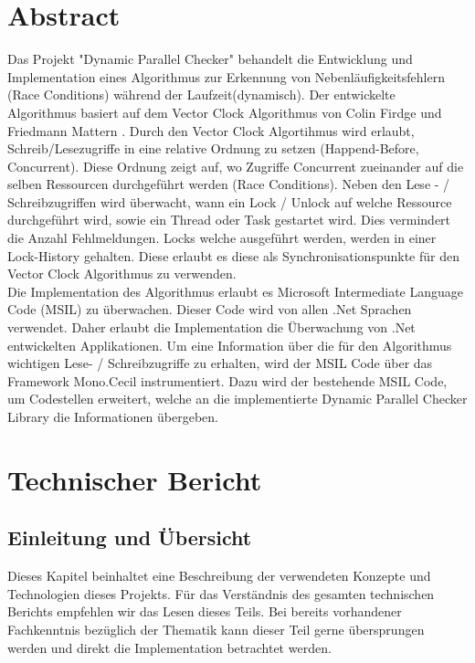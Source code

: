 \documentclass[10pt,a4paper]{article}
\begin{document}
\section{Abstract}
\begin{flushleft}
Das Projekt "Dynamic Parallel Checker" behandelt die Entwicklung und Implementation eines Algorithmus zur Erkennung von Nebenläufigkeitsfehlern (Race Conditions) während der Laufzeit(dynamisch). Der entwickelte Algorithmus basiert auf dem Vector Clock Algorithmus von Colin Firdge und Friedmann Mattern \cite{acsc}. Durch den Vector Clock Algortihmus wird erlaubt, Schreib/Lesezugriffe in eine relative Ordnung zu setzen (Happend-Before, Concurrent). Diese Ordnung zeigt auf, wo Zugriffe Concurrent zueinander auf die selben Ressourcen durchgeführt werden (Race Conditions). Neben den Lese - / Schreibzugriffen wird überwacht, wann ein Lock / Unlock auf welche Ressource durchgeführt wird, sowie ein Thread oder Task gestartet wird. Dies vermindert die Anzahl Fehlmeldungen. Locks welche ausgeführt werden, werden in einer Lock-History gehalten. Diese erlaubt es diese als Synchronisationspunkte für den Vector Clock Algorithmus zu verwenden.\\
Die Implementation des Algorithmus erlaubt es Microsoft Intermediate Language Code (MSIL) zu überwachen. Dieser Code wird von allen .Net Sprachen verwendet. Daher erlaubt die Implementation die Überwachung von .Net entwickelten Applikationen. Um eine Information über die für den Algorithmus wichtigen Lese- / Schreibzugriffe zu erhalten, wird der MSIL Code über das Framework Mono.Cecil instrumentiert. Dazu wird der bestehende MSIL Code, um Codestellen erweitert, welche an die implementierte Dynamic Parallel Checker Library die Informationen übergeben.
\end{flushleft}
\newpage
\section{Technischer Bericht}
\subsection{Einleitung und Übersicht}
Dieses Kapitel beinhaltet eine Beschreibung der verwendeten Konzepte und Technologien dieses Projekts. Für das Verständnis des gesamten technischen Berichts empfehlen wir das Lesen dieses Teils. Bei bereits vorhandener Fachkenntnis bezüglich der Thematik kann dieser Teil gerne übersprungen werden und direkt die Implementation betrachtet werden.
\end{document}
